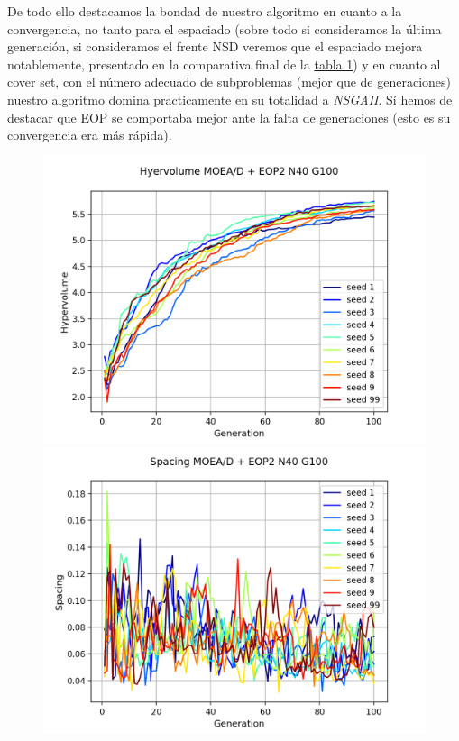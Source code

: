 De todo ello destacamos la bondad de nuestro algoritmo en cuanto a la convergencia, no tanto para el espaciado (sobre todo si consideramos la última generación, si consideramos el frente NSD veremos que el espaciado mejora notablemente, presentado en la comparativa final de la \hyperref[table:1]{tabla 1}) y en cuanto al cover set, con el número adecuado de subproblemas (mejor que de generaciones) nuestro algoritmo domina practicamente en su totalidad a \textit{NSGAII}. Sí hemos de destacar que EOP se comportaba mejor ante la falta de generaciones (esto es su convergencia era más rápida). \\

\begin{figure}[H]
\centering
\includegraphics[scale=0.43]{figures/METRICS_EOP2/Hypervol_N40_G100.png} \quad 
\includegraphics[scale=0.43]{figures/METRICS_EOP2/Spacing_N40_G100.png}\\

\end{figure}
